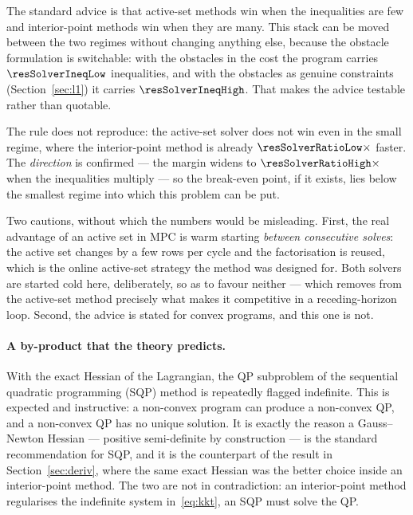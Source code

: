 \documentclass[11pt,a4paper]{article}
\begin{document}
The standard advice is that active-set methods win when the inequalities are few and interior-point methods
win when they are many. This stack can be moved between the two regimes without changing anything else,
because the obstacle formulation is switchable: with the obstacles in the cost the program carries
$\resSolverIneqLow$ inequalities, and with the obstacles as genuine constraints (Section~\ref{sec:l1}) it
carries $\resSolverIneqHigh$. That makes the advice testable rather than quotable.

\begin{table}[htbp]
  \centering
  \small
  \caption{%
  The same instance solved by a primal--dual interior-point method and by an SQP with an active-set QP
  solver, in both obstacle regimes. Both are started cold. Bold: the faster of the two.}
  \label{res:tab:solvercmp}
\end{table}

The rule does not reproduce: the active-set solver does not win even in the small regime, where the
interior-point method is already $\resSolverRatioLow\times$ faster. The \emph{direction} is confirmed --- the
margin widens to $\resSolverRatioHigh\times$ when the inequalities multiply --- so the break-even point, if
it exists, lies below the smallest regime into which this problem can be put.

Two cautions, without which the numbers would be misleading. First, the real advantage of an active set in
MPC is warm starting \emph{between consecutive solves}: the active set changes by a few rows per cycle and
the factorisation is reused, which is the online active-set strategy the method was designed for. Both
solvers are started cold here, deliberately, so as to favour neither --- which removes from the active-set
method precisely what makes it competitive in a receding-horizon loop. Second, the advice is stated for
convex programs, and this one is not.

\paragraph{A by-product that the theory predicts.} With the exact Hessian of the Lagrangian, the QP subproblem of the sequential quadratic
programming (SQP) method is repeatedly flagged indefinite. This is expected and instructive: a non-convex
program can produce a non-convex QP, and a non-convex QP has no unique solution. It is exactly the reason a
Gauss--Newton Hessian --- positive semi-definite by construction --- is the standard recommendation for SQP,
and it is the counterpart of the result in Section~\ref{sec:deriv}, where the same exact Hessian was the
better choice inside an interior-point method. The two are not in contradiction: an interior-point method
regularises the indefinite system in~\eqref{eq:kkt}, an SQP must solve the QP.
\end{document}
